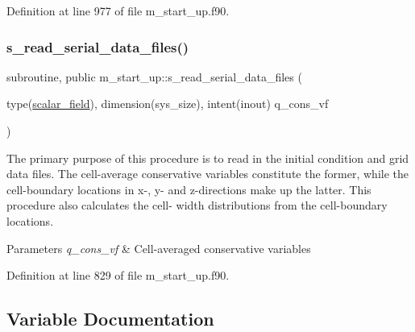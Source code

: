 Definition at line 977 of file m\+\_\+start\+\_\+up.\+f90.

\mbox{\label{namespacem__start__up_abd3c3fd9fbb80ef2ddaf82945c1c1af9}} 
\subsubsection{\texorpdfstring{s\+\_\+read\+\_\+serial\+\_\+data\+\_\+files()}{s\_read\_serial\_data\_files()}}
{\footnotesize\ttfamily subroutine, public m\+\_\+start\+\_\+up\+::s\+\_\+read\+\_\+serial\+\_\+data\+\_\+files (\begin{DoxyParamCaption}\item[{type(\hyperlink{structm__derived__types_1_1scalar__field}{scalar\+\_\+field}), dimension(sys\+\_\+size), intent(inout)}]{q\+\_\+cons\+\_\+vf }\end{DoxyParamCaption})}



The primary purpose of this procedure is to read in the initial condition and grid data files. The cell-\/average conservative variables constitute the former, while the cell-\/boundary locations in x-\/, y-\/ and z-\/directions make up the latter. This procedure also calculates the cell-\/ width distributions from the cell-\/boundary locations. 


\begin{DoxyParams}{Parameters}
{\em q\+\_\+cons\+\_\+vf} & Cell-\/averaged conservative variables \\
\hline
\end{DoxyParams}


Definition at line 829 of file m\+\_\+start\+\_\+up.\+f90.



\subsection{Variable Documentation}
\mbox{\label{namespacem__start__up_acd3b736578c59b1bd9dfc4b81f4a7279}} 
